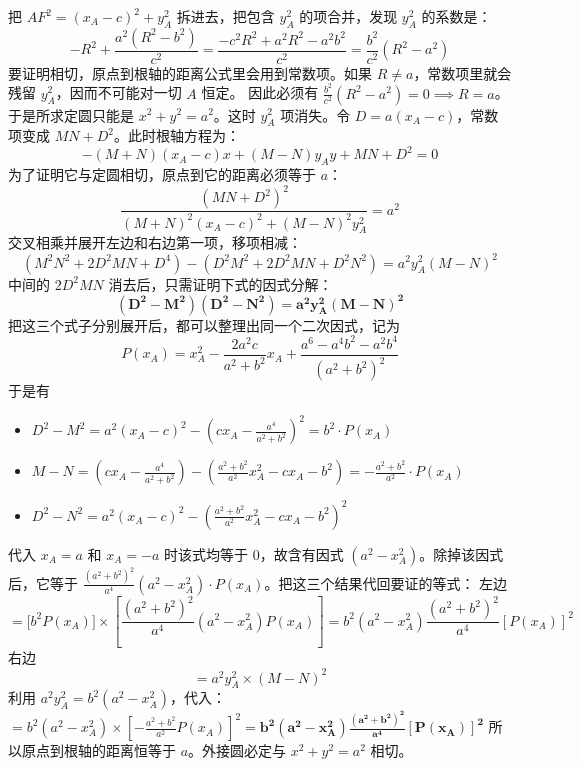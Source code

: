 \begin{solution}
把 $AF^2 = (x_A-c)^2 + y_A^2$ 拆进去，把包含 $y_A^2$ 的项合并，发现 $y_A^2$ 的系数是：
$$ -R^2 + \frac{a^2(R^2-b^2)}{c^2} = \frac{-c^2 R^2 + a^2 R^2 - a^2 b^2}{c^2} = \frac{b^2}{c^2}(R^2 - a^2) $$
要证明相切，原点到根轴的距离公式里会用到常数项。如果 $R \neq a$，常数项里就会残留 $y_A^2$，因而不可能对一切 $A$ 恒定。
因此必须有 $\frac{b^2}{c^2}(R^2 - a^2) = 0 \implies R = a$。于是所求定圆只能是 $x^2 + y^2 = a^2$。这时 $y_A^2$ 项消失。令 $D = a(x_A-c)$，常数项变成 $MN + D^2$。此时根轴方程为：
$$ -(M+N)(x_A-c)x + (M-N)y_A y + MN + D^2 = 0 $$
为了证明它与定圆相切，原点到它的距离必须等于 $a$：
$$ \frac{(MN + D^2)^2}{(M+N)^2(x_A-c)^2 + (M-N)^2 y_A^2} = a^2 $$
交叉相乘并展开左边和右边第一项，移项相减：
\[(M^2 N^2 + 2D^2 MN + D^4) - (D^2 M^2 + 2D^2 MN + D^2 N^2) = a^2 y_A^2 (M-N)^2\]
中间的 $2D^2 MN$ 消去后，只需证明下式的因式分解：
$$ \mathbf{(D^2 - M^2)(D^2 - N^2) = a^2 y_A^2 (M-N)^2} $$
把这三个式子分别展开后，都可以整理出同一个二次因式，记为
$$ P(x_A) = x_A^2 - \frac{2a^2c}{a^2+b^2}x_A + \frac{a^6 - a^4 b^2 - a^2 b^4}{(a^2+b^2)^2} $$
于是有
\begin{itemize}
\item $D^2 - M^2 = a^2(x_A-c)^2 - (cx_A - \frac{a^4}{a^2+b^2})^2 = b^2 \cdot P(x_A)$
\item $M - N = (cx_A - \frac{a^4}{a^2+b^2}) - (\frac{a^2+b^2}{a^2}x_A^2 - cx_A - b^2) =-\frac{a^2+b^2}{a^2} \cdot P(x_A)$
\item $D^2 - N^2 = a^2(x_A-c)^2 - (\frac{a^2+b^2}{a^2}x_A^2 - cx_A - b^2)^2$
\end{itemize}
代入 $x_A = a$ 和 $x_A = -a$ 时该式均等于 $0$，故含有因式 $(a^2 - x_A^2)$。除掉该因式后，它等于 $\frac{(a^2+b^2)^2}{a^4} (a^2 - x_A^2) \cdot P(x_A)$。把这三个结果代回要证的等式：
左边 
\[= \big[ b^2 P(x_A) \big] \times \left[ \frac{(a^2+b^2)^2}{a^4} (a^2 - x_A^2) P(x_A) \right] = {b^2(a^2 - x_A^2) \frac{(a^2+b^2)^2}{a^4} [P(x_A)]^2}\]
右边 \[= a^2 y_A^2 \times (M-N)^2\]
利用 $a^2 y_A^2 = b^2(a^2 - x_A^2)$，代入：$= b^2(a^2 - x_A^2) \times \left[ -\frac{a^2+b^2}{a^2} P(x_A) \right]^2 = \mathbf{b^2(a^2 - x_A^2) \frac{(a^2+b^2)^2}{a^4} [P(x_A)]^2}$
所以原点到根轴的距离恒等于 $a$。外接圆必定与 $x^2+y^2=a^2$ 相切。
\end{solution}

